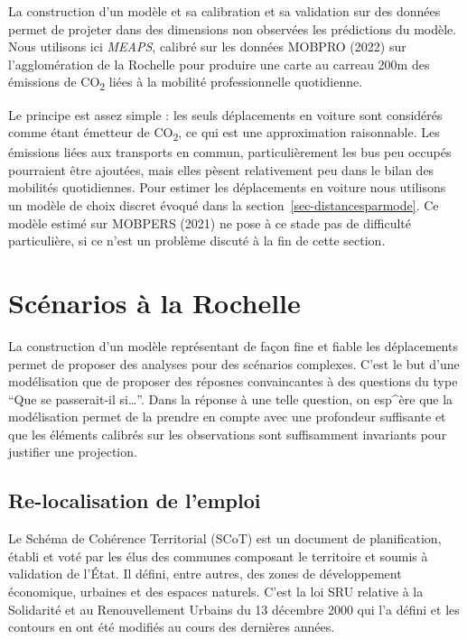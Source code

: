 \documentclass[
  10pt,
  a4paper,
  numbers=noendperiod,
  DIV=9]{scrartcl}
\begin{document}
La construction d'un modèle et sa calibration et sa validation sur des
données permet de projeter dans des dimensions non observées les
prédictions du modèle. Nous utilisons ici \emph{MEAPS}, calibré sur les
données MOBPRO (2022) sur l'agglomération de la Rochelle pour produire
une carte au carreau 200m des émissions de CO\textsubscript{2} liées à
la mobilité professionnelle quotidienne.

Le principe est assez simple : les seuls déplacements en voiture sont
considérés comme étant émetteur de CO\textsubscript{2}, ce qui est une
approximation raisonnable. Les émissions liées aux transports en commun,
particulièrement les bus peu occupés pourraient être ajoutées, mais
elles pèsent relativement peu dans le bilan des mobilités quotidiennes.
Pour estimer les déplacements en voiture nous utilisons un modèle de
choix discret évoqué dans la section~\ref{sec-distancesparmode}. Ce
modèle estimé sur MOBPERS (2021) ne pose à ce stade pas de difficulté
particulière, si ce n'est un problème discuté à la fin de cette section.


\hypertarget{sec-scenarios}{%
\chapter{Scénarios à la Rochelle}\label{sec-scenarios}}

La construction d'un modèle représentant de façon fine et fiable les
déplacements permet de proposer des analyses pour des scénarios
complexes. C'est le but d'une modélisation que de proposer des réposnes
convaincantes à des questions du type ``Que se passerait-il
si\ldots{}''. Dans la réponse à une telle question, on esp\^{}ère que la
modélisation permet de la prendre en compte avec une profondeur
suffisante et que les éléments calibrés sur les observations sont
suffisamment invariants pour justifier une projection.

\hypertarget{re-localisation-de-lemploi}{%
\section{Re-localisation de l'emploi}\label{re-localisation-de-lemploi}}

Le Schéma de Cohérence Territorial (SCoT) est un document de
planification, établi et voté par les élus des communes composant le
territoire et soumis à validation de l'État. Il défini, entre autres,
des zones de développement économique, urbaines et des espaces naturels.
C'est la loi SRU relative à la Solidarité et au Renouvellement Urbains
du 13 décembre 2000 qui l'a défini et les contours en ont été modifiés
au cours des dernières années.
\end{document}
